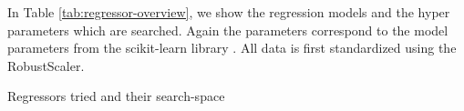 In Table \ref{tab:regressor-overview}, we show the regression models and the hyper parameters which are searched. Again the parameters correspond to the model parameters from the scikit-learn library \cite{scikit-learn}. All data is first standardized using the RobustScaler.
\begin{table}[H]
\centering

\caption{Regressors tried and their search-space}\label{tab:regressor-overview}
\end{table}

